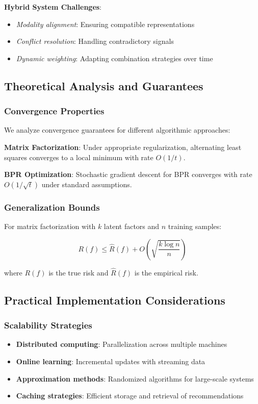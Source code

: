 \textbf{Hybrid System Challenges}:
\begin{itemize}
    \item \textit{Modality alignment}: Ensuring compatible representations
    \item \textit{Conflict resolution}: Handling contradictory signals
    \item \textit{Dynamic weighting}: Adapting combination strategies over time
\end{itemize}

\subsection{Theoretical Analysis and Guarantees}

\subsubsection{Convergence Properties}
We analyze convergence guarantees for different algorithmic approaches:

\textbf{Matrix Factorization}: Under appropriate regularization, alternating least squares converges to a local minimum with rate $O(1/t)$.

\textbf{BPR Optimization}: Stochastic gradient descent for BPR converges with rate $O(1/\sqrt{t})$ under standard assumptions.

\subsubsection{Generalization Bounds}
For matrix factorization with $k$ latent factors and $n$ training samples:

\begin{equation}
R(f) \leq \hat{R}(f) + O\left(\sqrt{\frac{k \log n}{n}}\right)
\end{equation}

where $R(f)$ is the true risk and $\hat{R}(f)$ is the empirical risk.

\subsection{Practical Implementation Considerations}

\subsubsection{Scalability Strategies}
\begin{itemize}
    \item \textbf{Distributed computing}: Parallelization across multiple machines
    \item \textbf{Online learning}: Incremental updates with streaming data
    \item \textbf{Approximation methods}: Randomized algorithms for large-scale systems
    \item \textbf{Caching strategies}: Efficient storage and retrieval of recommendations
\end{itemize}


